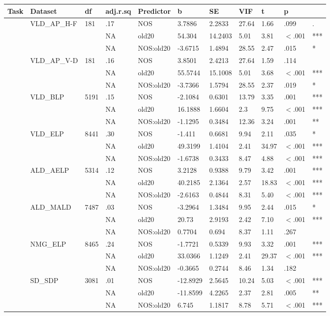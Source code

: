 \begin{table}[ht]
\centering
\begingroup\normalsize
\begin{tabular}{lllllllllll}
  \hline
Task & Dataset & df & adj.r.sq & Predictor & b & SE & VIF & t & p &  \\ 
  \hline
 & VLD\_AP\_H-F & 181 & .17 & NOS & 3.7886 & 2.2833 & 27.64 & 1.66 & .099 & . \\ 
   &  &  & NA & old20 & 54.304 & 14.2403 & 5.01 & 3.81 & $<$.001 & *** \\ 
   &  &  & NA & NOS:old20 & -3.6715 & 1.4894 & 28.55 & 2.47 & .015 & * \\ 
   & VLD\_AP\_V-D & 181 & .16 & NOS & 3.8501 & 2.4213 & 27.64 & 1.59 & .114 &   \\ 
   &  &  & NA & old20 & 55.5744 & 15.1008 & 5.01 & 3.68 & $<$.001 & *** \\ 
   &  &  & NA & NOS:old20 & -3.7366 & 1.5794 & 28.55 & 2.37 & .019 & * \\ 
   & VLD\_BLP & 5191 & .15 & NOS & -2.1084 & 0.6301 & 13.79 & 3.35 & .001 & *** \\ 
   &  &  & NA & old20 & 16.1888 & 1.6604 & 2.3 & 9.75 & $<$.001 & *** \\ 
   &  &  & NA & NOS:old20 & -1.1295 & 0.3484 & 12.36 & 3.24 & .001 & ** \\ 
   & VLD\_ELP & 8441 & .30 & NOS & -1.411 & 0.6681 & 9.94 & 2.11 & .035 & * \\ 
   &  &  & NA & old20 & 49.3199 & 1.4104 & 2.41 & 34.97 & $<$.001 & *** \\ 
   &  &  & NA & NOS:old20 & -1.6738 & 0.3433 & 8.47 & 4.88 & $<$.001 & *** \\ 
   & ALD\_AELP & 5314 & .12 & NOS & 3.2128 & 0.9388 & 9.79 & 3.42 & .001 & *** \\ 
   &  &  & NA & old20 & 40.2185 & 2.1364 & 2.57 & 18.83 & $<$.001 & *** \\ 
   &  &  & NA & NOS:old20 & -2.6163 & 0.4844 & 8.31 & 5.40 & $<$.001 & *** \\ 
   & ALD\_MALD & 7487 & .03 & NOS & -3.2964 & 1.3484 & 9.95 & 2.44 & .015 & * \\ 
   &  &  & NA & old20 & 20.73 & 2.9193 & 2.42 & 7.10 & $<$.001 & *** \\ 
   &  &  & NA & NOS:old20 & 0.7704 & 0.694 & 8.37 & 1.11 & .267 &   \\ 
   & NMG\_ELP & 8465 & .24 & NOS & -1.7721 & 0.5339 & 9.93 & 3.32 & .001 & *** \\ 
   &  &  & NA & old20 & 33.0366 & 1.1249 & 2.41 & 29.37 & $<$.001 & *** \\ 
   &  &  & NA & NOS:old20 & -0.3665 & 0.2744 & 8.46 & 1.34 & .182 &   \\ 
   & SD\_SDP & 3081 & .01 & NOS & -12.8929 & 2.5645 & 10.24 & 5.03 & $<$.001 & *** \\ 
   &  &  & NA & old20 & -11.8599 & 4.2265 & 2.37 & 2.81 & .005 & ** \\ 
   &  &  & NA & NOS:old20 & 6.745 & 1.1817 & 8.78 & 5.71 & $<$.001 & *** \\ 
   \hline
\end{tabular}
\endgroup
\end{table}
